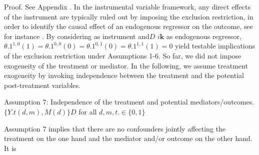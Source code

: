 \documentclass{article}
\begin{document}
Proof. See Appendix . In the instrumental variable framework, any direct effects
of the instrument are typically ruled out by imposing the exclusion restriction, in
order to identify the causal effect of an endogenous regressor on the outcome, see
for instance . By considering  as instrument and$D$ $i \mathbf { k }$ as endogenous regressor,
$\theta . { 1 } ^ { 1, 0 } ( 1 ) = \theta . { 1 } ^ { 0, 0 } ( 0 ) = \theta . { 1 } ^ { 0, 1 } ( 0 ) = \theta . { 1 } ^ { 1, 1 } ( 1 ) = 0$ yield testable implications of the exclusion
restriction under Assumptions 1-6.  So far, we did not impose exogeneity of the
treatment or mediator. In the following, we assume treatment exogeneity by invoking
independence between the treatment and the potential post-treatment variables.


Assumption 7: Independence of the treatment and potential mediators/outcomes.
$\{ Y . { t } ( d, m ), M ( d ) \} D$ for all $d, m, t. \in \{ 0, 1 \}$


Assumption 7 implies that there are no confounders jointly affecting the treatment
on the one hand and the mediator and/or outcome on the other hand. It is
\end{document}
